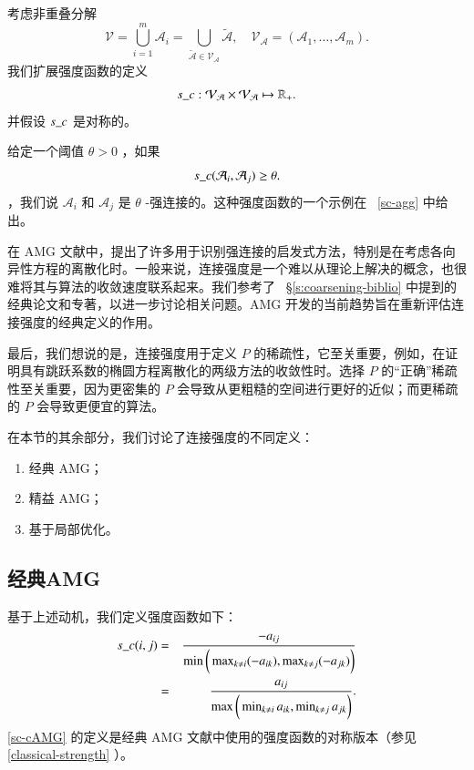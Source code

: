 \documentclass[12pt]{acta_2011xz}
\begin{document}
考虑非重叠分解
   \begin{equation}
  \label{Vagg}
    \mathcal V=\bigcup_{i=1}^m\mathcal A_i=\bigcup_{\tilde{\mathcal A}\in \mathcal V_{\mathcal A}}\tilde{\mathcal A}, \quad 
\mathcal V_{\mathcal A} =(\mathcal A_1, \ldots, \mathcal A_m).
\end{equation}    我们扩展强度函数的定义
   \begin{equation}
  \label{sc-patches}
    s\_c: \mathcal V_{\mathcal A} \times\mathcal V_{\mathcal A} \mapsto \mathbb R_{+}.
\end{equation}    并假设    $s\_c$    是对称的。  

给定一个阈值    $\theta>0$    ，如果 
   $$
s\_c(\mathcal A_i,\mathcal A_j)
\ge \theta.
$$    ，我们说    $\mathcal A_i$    和
   $\mathcal A_j$    是    $\theta$    -强连接的。这种强度函数的一个示例在~    \eqref{sc-agg}    中给出。  

在 AMG 文献中，提出了许多用于识别强连接的启发式方法，特别是在考虑各向异性方程的离散化时。一般来说，连接强度是一个难以从理论上解决的概念，也很难将其与算法的收敛速度联系起来。我们参考了~    \S       \ref{s:coarsening-biblio}    中提到的经典论文和专著，以进一步讨论相关问题。AMG 开发的当前趋势旨在重新评估连接强度的经典定义的作用。  

最后，我们想说的是，连接强度用于定义    $P$    的稀疏性，它至关重要，例如，在证明具有跳跃系数的椭圆方程离散化的两级方法的收敛性时。选择    $P$    的“正确”稀疏性至关重要，因为更密集的    $P$    会导致从更粗糙的空间进行更好的近似；而更稀疏的    $P$    会导致更便宜的算法。  

在本节的其余部分，我们讨论了连接强度的不同定义：
   \begin{enumerate}

   \item   经典 AMG；   \item   精益 AMG；   \item   基于局部优化。  \end{enumerate}     

   \subsection{经典AMG  }       \label{s:strength}    基于上述动机，我们定义强度函数如下：
   \begin{eqnarray}
s\_c(i,j)& =&\frac{-a_{ij}}{\min\bigg(\max_{k\ne i}(-a_{ik}),
  \max_{k\ne j}(-a_{jk})\bigg)} \nonumber
 \\ 
&=&\frac{a_{ij}}{\max\bigg(\min_{k\neq i}a_{ik}, \min_{k\neq j}a_{jk}\bigg)}. 
\label{sc-cAMG}
\end{eqnarray}       \eqref{sc-cAMG}    的定义是经典 AMG 文献中使用的强度函数的对称版本（参见    \eqref{classical-strength}    ）。  
\end{document}
